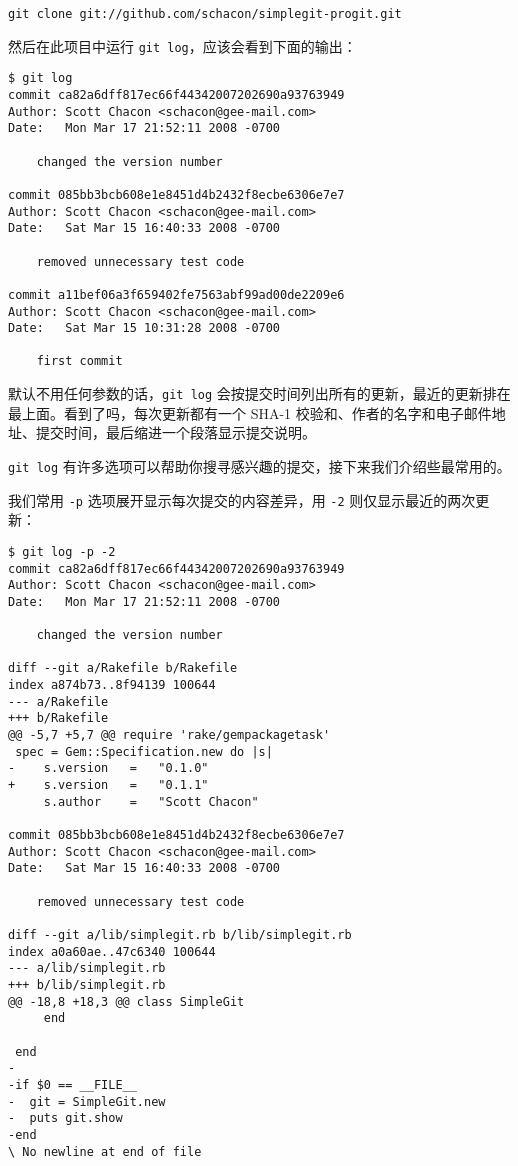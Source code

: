 \documentclass[a4paper]{book}
\begin{document}
\begin{shaded}\begin{verbatim}
git clone git://github.com/schacon/simplegit-progit.git
\end{verbatim}\end{shaded}

然后在此项目中运行 \texttt{git log}，应该会看到下面的输出：

\begin{shaded}\begin{verbatim}
$ git log
commit ca82a6dff817ec66f44342007202690a93763949
Author: Scott Chacon <schacon@gee-mail.com>
Date:   Mon Mar 17 21:52:11 2008 -0700

    changed the version number

commit 085bb3bcb608e1e8451d4b2432f8ecbe6306e7e7
Author: Scott Chacon <schacon@gee-mail.com>
Date:   Sat Mar 15 16:40:33 2008 -0700

    removed unnecessary test code

commit a11bef06a3f659402fe7563abf99ad00de2209e6
Author: Scott Chacon <schacon@gee-mail.com>
Date:   Sat Mar 15 10:31:28 2008 -0700

    first commit
\end{verbatim}\end{shaded}

默认不用任何参数的话，\texttt{git log} 会按提交时间列出所有的更新，最近的更新排在最上面。看到了吗，每次更新都有一个 SHA-1 校验和、作者的名字和电子邮件地址、提交时间，最后缩进一个段落显示提交说明。

\texttt{git log} 有许多选项可以帮助你搜寻感兴趣的提交，接下来我们介绍些最常用的。

我们常用 \texttt{-p} 选项展开显示每次提交的内容差异，用 \texttt{-2} 则仅显示最近的两次更新：

\begin{shaded}\begin{verbatim}
$ git log -p -2
commit ca82a6dff817ec66f44342007202690a93763949
Author: Scott Chacon <schacon@gee-mail.com>
Date:   Mon Mar 17 21:52:11 2008 -0700

    changed the version number

diff --git a/Rakefile b/Rakefile
index a874b73..8f94139 100644
--- a/Rakefile
+++ b/Rakefile
@@ -5,7 +5,7 @@ require 'rake/gempackagetask'
 spec = Gem::Specification.new do |s|
-    s.version   =   "0.1.0"
+    s.version   =   "0.1.1"
     s.author    =   "Scott Chacon"

commit 085bb3bcb608e1e8451d4b2432f8ecbe6306e7e7
Author: Scott Chacon <schacon@gee-mail.com>
Date:   Sat Mar 15 16:40:33 2008 -0700

    removed unnecessary test code

diff --git a/lib/simplegit.rb b/lib/simplegit.rb
index a0a60ae..47c6340 100644
--- a/lib/simplegit.rb
+++ b/lib/simplegit.rb
@@ -18,8 +18,3 @@ class SimpleGit
     end

 end
-
-if $0 == __FILE__
-  git = SimpleGit.new
-  puts git.show
-end
\ No newline at end of file
\end{verbatim}\end{shaded}
\end{document}
